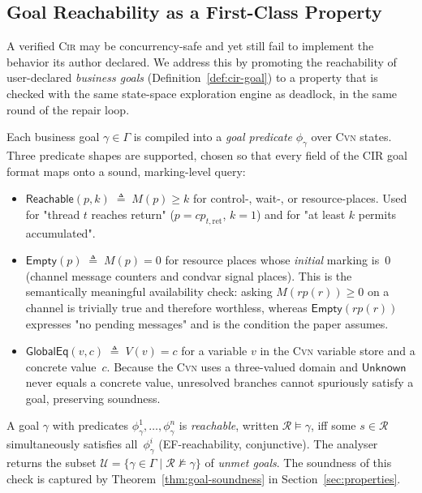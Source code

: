 \subsection{Goal Reachability as a First-Class Property}
\label{subsec:goal-reach}

A verified \textsc{Cir} may be concurrency-safe and yet still fail to
implement the behavior its author declared. We address this by
promoting the reachability of user-declared \emph{business goals}
(Definition~\ref{def:cir-goal}) to a property that is checked with the
same state-space exploration engine as deadlock, in the same round of
the repair loop.

Each business goal $\gamma\in\Gamma$ is compiled into a \emph{goal
predicate}
$\phi_{\gamma}$ over \textsc{Cvn} states. Three predicate shapes are
supported, chosen so that every field of the CIR goal format maps onto
a sound, marking-level query:

\begin{itemize}[leftmargin=1.5em]
  \item $\mathsf{Reachable}(p,k)\;\triangleq\;M(p)\ge k$\; for
    control-, wait-, or resource-places. Used for "thread $t$ reaches
    return" ($p=cp_{t,\mathrm{ret}}$, $k=1$) and for "at least $k$
    permits accumulated".
  \item $\mathsf{Empty}(p)\;\triangleq\;M(p)=0$\; for resource places
    whose \emph{initial} marking is~$0$ (channel message counters and
    condvar signal places). This is the semantically meaningful
    availability check: asking $M(rp(r))\ge 0$ on a channel is
    trivially true and therefore worthless, whereas
    $\mathsf{Empty}(rp(r))$ expresses "no pending messages" and is the
    condition the paper assumes.
  \item $\mathsf{GlobalEq}(v,c)\;\triangleq\; V(v)=c$\; for a variable
    $v$ in the \textsc{Cvn} variable store and a concrete
    value~$c$. Because the \textsc{Cvn} uses a three-valued domain and
    $\mathsf{Unknown}$ never equals a concrete value, unresolved
    branches cannot spuriously satisfy a goal, preserving soundness.
\end{itemize}

A goal $\gamma$ with predicates $\phi_{\gamma}^{1},\dots,\phi_{\gamma}^{n}$
is \emph{reachable}, written $\mathcal{R}\models\gamma$, iff some
$s\in\mathcal{R}$ simultaneously satisfies all~$\phi_{\gamma}^{i}$
(EF-reachability, conjunctive). The analyser returns the subset
$\mathcal{U}=\{\gamma\in\Gamma\mid\mathcal{R}\not\models\gamma\}$ of
\emph{unmet goals}. The soundness of this check is captured by
Theorem~\ref{thm:goal-soundness} in Section~\ref{sec:properties}.


